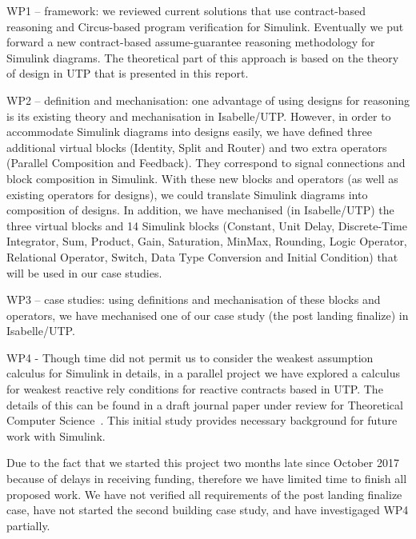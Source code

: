 WP1 – framework: we reviewed current solutions that use contract-based reasoning and Circus-based program verification for Simulink. Eventually we put forward a new contract-based assume-guarantee reasoning methodology for Simulink diagrams. The theoretical part of this approach is based on the theory of design in UTP that is presented in this report. 

WP2 – definition and mechanisation: one advantage of using designs for reasoning is its existing theory and mechanisation in Isabelle/UTP. However, in order to accommodate Simulink diagrams into designs easily, we have defined three additional virtual blocks (Identity, Split and Router) and two extra operators (Parallel Composition and Feedback). They correspond to signal connections and block composition in Simulink. With these new blocks and operators (as well as existing operators for designs), we could translate Simulink diagrams into composition of designs. In addition, we have mechanised (in Isabelle/UTP) the three virtual blocks and 14 Simulink blocks (Constant, Unit Delay, Discrete-Time Integrator, Sum, Product, Gain, Saturation, MinMax, Rounding, Logic Operator, Relational Operator, Switch, Data Type Conversion and Initial Condition) that will be used in our case studies.  

WP3 – case studies: using definitions and mechanisation of these blocks and operators, we have mechanised one of our case study (the post landing finalize) in Isabelle/UTP. 

WP4 - Though time did not permit us to consider the weakest assumption calculus for Simulink in details, in a parallel project we have explored a calculus for weakest reactive rely conditions for reactive contracts based in UTP. The details of this can be found in a draft journal paper under review for Theoretical Computer Science~\cite{Foster2017b}. This initial study provides necessary background for future work with Simulink. 

Due to the fact that we started this project two months late since October 2017 because of delays in receiving funding, therefore we have limited time to finish all proposed work. We have not verified all requirements of the post landing finalize case, have not started the second building case study, and have investigaged WP4 partially.

